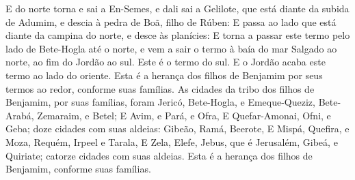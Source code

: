 {E do norte torna e sai a En-Semes, e dali sai a Gelilote, que está diante da subida de Adumim, e descia à pedra de Boã, filho de Rúben:
E passa ao lado que está diante da campina do norte, e desce às planícies:
E torna a passar este termo pelo lado de Bete-Hogla até o norte, e vem a sair o termo à baía do mar Salgado ao norte, ao fim do Jordão ao sul. Este é o termo do sul.
E o Jordão acaba este termo ao lado do oriente. Esta é a herança dos filhos de Benjamim por seus termos ao redor, conforme suas famílias.
As cidades da tribo dos filhos de Benjamim, por suas famílias, foram Jericó, Bete-Hogla, e Emeque-Queziz,
Bete-Arabá, Zemaraim, e Betel;
E Avim, e Pará, e Ofra,
E Quefar-Amonai, Ofni, e Geba; doze cidades com suas aldeias:
Gibeão, Ramá, Beerote,
E Mispá, Quefira, e Moza,
Requém, Irpeel e Tarala,
E Zela, Elefe, Jebus, que é Jerusalém, Gibeá, e Quiriate; catorze cidades com suas aldeias. Esta é a herança dos filhos de Benjamim, conforme suas famílias.

\par }

